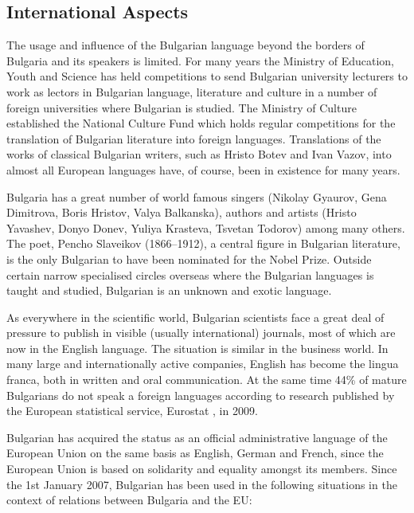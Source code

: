 \documentclass[]{../../metanetpaper}
\begin{document}
\begin{multicols}{2}
\subsection{International Aspects}

The usage and influence of the Bulgarian language beyond the borders of Bulgaria and its speakers is limited. For many years the Ministry of Education, Youth and Science has held competitions to send Bulgarian university lecturers to work as lectors in Bulgarian language, literature and culture in a number of foreign universities where Bulgarian is studied. The Ministry of Culture established the National Culture Fund which holds regular competitions for the translation of Bulgarian literature into foreign languages. Translations of the works of classical Bulgarian writers, such as Hristo Botev and Ivan Vazov, into almost all European languages have, of course, been in existence for many years. 
\columnbreak

Bulgaria has a great number of world famous singers (Nikolay Gyaurov, Gena Dimitrova, Boris Hristov, Valya Balkanska), authors and artists (Hristo Yavashev, Donyo Donev, Yuliya Krasteva, Tsvetan Todorov) among many others. The poet, Pencho Slaveikov (1866--1912), a central figure in Bulgarian literature, is the only Bulgarian to have been nominated for the Nobel Prize. Outside certain narrow specialised circles overseas where the Bulgarian languages is taught and studied, Bulgarian is an unknown and exotic language.


As everywhere in the scientific world, Bulgarian scientists face a great deal of pressure to publish in visible (usually international) journals, most of which are now in the English language. The situation is similar in the business world. In many large and internationally active companies, English has become the lingua franca, both in written and oral communication. At the same time 44\% of mature Bulgarians do not speak a foreign languages according to research published by the European statistical service, Eurostat \cite{epp}, in 2009. 

Bulgarian has acquired the status as an official administrative language of the European Union on the same basis as English, German and French, since the European Union is based on solidarity and equality amongst its members. Since the 1st January 2007, Bulgarian has been used in the following situations in the context of relations between Bulgaria and the EU:


\end{multicols}
\end{document}
